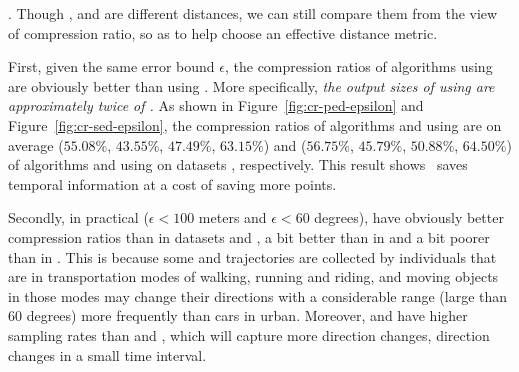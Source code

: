 .
Though \ped, \sed and \dad are different distances, we can still compare them from the view of compression ratio, so as to help choose an effective distance metric.

First, given the same error bound $\epsilon$, the compression ratios of algorithms using \ped are obviously better
than using \sed. More specifically, \emph{the output sizes of using \sed are approximately twice of \ped.}
%
As shown in Figure~\ref{fig:cr-ped-epsilon} and Figure~\ref{fig:cr-sed-epsilon}, the compression ratios of algorithms \tpa and \dpa
using \ped are on average ($55.08\%$, $43.55\%$, $47.49\%$, $63.15\%$) and ($56.75\%$, $45.79\%$,
$50.88\%$, $64.50\%$) of algorithms \tpa and \dpa using \sed on datasets \dSets, respectively.
%
%
This result shows ~\sed saves temporal information at a cost of saving more points.


Secondly, in practical (\eg $\epsilon <100$ meters and $\epsilon < 60$ degrees), \sed have obviously better compression ratios than \dad in datasets \geolife and \mopsi, a bit better than \dad in \taxi and a bit poorer than \dad in \ucar.
This is because some \geolife and \mopsi trajectories are collected by individuals that are in transportation modes of walking, running and riding, and moving objects in those modes may change their directions with a considerable range (\eg large than $60$ degrees) more frequently than cars in urban. Moreover, \geolife and \mopsi have higher sampling rates than \taxi and \ucar, which will capture more direction changes, \ie direction changes in a small time interval.







